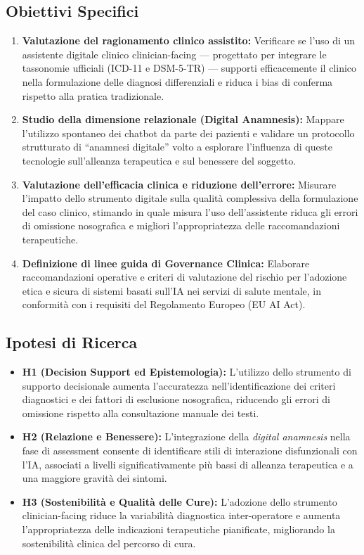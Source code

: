 \documentclass[11pt,a4paper]{article}
\begin{document}
\subsection{Obiettivi Specifici}
\begin{enumerate}
    \item \textbf{Valutazione del ragionamento clinico assistito:} Verificare se l'uso di un assistente digitale clinico clinician-facing --- progettato per integrare le tassonomie ufficiali (ICD-11 e DSM-5-TR) --- supporti efficacemente il clinico nella formulazione delle diagnosi differenziali e riduca i bias di conferma rispetto alla pratica tradizionale.
    \item \textbf{Studio della dimensione relazionale (Digital Anamnesis):} Mappare l'utilizzo spontaneo dei chatbot da parte dei pazienti e validare un protocollo strutturato di ``anamnesi digitale'' volto a esplorare l'influenza di queste tecnologie sull'alleanza terapeutica e sul benessere del soggetto.
    \item \textbf{Valutazione dell'efficacia clinica e riduzione dell'errore:} Misurare l'impatto dello strumento digitale sulla qualità complessiva della formulazione del caso clinico, stimando in quale misura l'uso dell'assistente riduca gli errori di omissione nosografica e migliori l'appropriatezza delle raccomandazioni terapeutiche.
    \item \textbf{Definizione di linee guida di Governance Clinica:} Elaborare raccomandazioni operative e criteri di valutazione del rischio per l'adozione etica e sicura di sistemi basati sull'IA nei servizi di salute mentale, in conformità con i requisiti del Regolamento Europeo (EU AI Act).
\end{enumerate}

\subsection{Ipotesi di Ricerca}
\begin{itemize}
    \item \textbf{H1 (Decision Support ed Epistemologia):} L'utilizzo dello strumento di supporto decisionale aumenta l'accuratezza nell'identificazione dei criteri diagnostici e dei fattori di esclusione nosografica, riducendo gli errori di omissione rispetto alla consultazione manuale dei testi.
    \item \textbf{H2 (Relazione e Benessere):} L'integrazione della \textit{digital anamnesis} nella fase di assessment consente di identificare stili di interazione disfunzionali con l'IA, associati a livelli significativamente più bassi di alleanza terapeutica e a una maggiore gravità dei sintomi.
    \item \textbf{H3 (Sostenibilità e Qualità delle Cure):} L'adozione dello strumento clinician-facing riduce la variabilità diagnostica inter-operatore e aumenta l'appropriatezza delle indicazioni terapeutiche pianificate, migliorando la sostenibilità clinica del percorso di cura.
\end{itemize}
\end{document}
